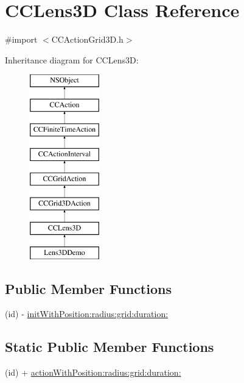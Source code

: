 \hypertarget{interface_c_c_lens3_d}{\section{C\-C\-Lens3\-D Class Reference}
\label{interface_c_c_lens3_d}
}


{\ttfamily \#import $<$C\-C\-Action\-Grid3\-D.\-h$>$}

Inheritance diagram for C\-C\-Lens3\-D\-:\begin{figure}[H]
\begin{center}
\leavevmode
\includegraphics[height=8.000000cm]{interface_c_c_lens3_d}
\end{center}
\end{figure}
\subsection*{Public Member Functions}
\begin{DoxyCompactItemize}
\item 
(id) -\/ \hyperlink{interface_c_c_lens3_d_a582a621acc461e5d0de48a29fbfbf254}{init\-With\-Position\-:radius\-:grid\-:duration\-:}
\end{DoxyCompactItemize}
\subsection*{Static Public Member Functions}
\begin{DoxyCompactItemize}
\item 
(id) + \hyperlink{interface_c_c_lens3_d_af44c7f8c2184bebade8af8e260b04804}{action\-With\-Position\-:radius\-:grid\-:duration\-:}
\end{DoxyCompactItemize}
